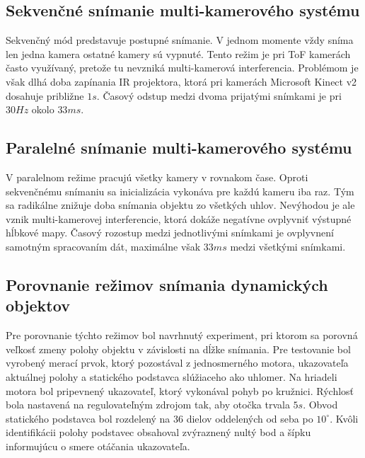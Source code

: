 \subsection{Sekvenčné snímanie multi-kamerového systému}

Sekvenčný mód predstavuje postupné snímanie. V jednom momente vždy sníma len jedna kamera ostatné kamery sú vypnuté. Tento režim je pri ToF kamerách často využívaný, pretože tu nevzniká multi-kamerová interferencia. Problémom je však dlhá doba zapínania IR projektora, ktorá pri kamerách Microsoft Kinect v2 dosahuje približne $1s$. Časový odstup medzi dvoma prijatými snímkami je pri $30Hz$ okolo $33ms$.

\subsection{Paralelné snímanie multi-kamerového systému}

V paralelnom režime pracujú všetky kamery v rovnakom čase. Oproti sekvenčnému snímaniu sa inicializácia vykonáva pre každú kameru iba raz. Tým sa radikálne znižuje doba snímania objektu zo všetkých uhlov. Nevýhodou je ale vznik multi-kamerovej interferencie, ktorá dokáže negatívne ovplyvniť výstupné hĺbkové mapy. Časový rozostup medzi jednotlivými snímkami je ovplyvnení samotným spracovaním dát, maximálne však $33ms$ medzi všetkými snímkami. 

\subsection{Porovnanie režimov snímania dynamických objektov}
\label{sec:serial_parallel}
Pre porovnanie týchto režimov bol navrhnutý experiment, pri ktorom sa porovná veľkosť zmeny polohy objektu v závislosti na dĺžke snímania. Pre testovanie bol vyrobený merací prvok, ktorý pozostával z jednosmerného motora, ukazovateľa aktuálnej polohy a statického podstavca slúžiaceho ako uhlomer. Na hriadeli motora bol pripevnený ukazovateľ, ktorý vykonával pohyb po kružnici. Rýchlosť bola nastavená na regulovateľným zdrojom tak, aby otočka trvala $5s$. Obvod statického podstavca bol rozdelený na 36 dielov oddelených od seba po $10^\circ$. Kvôli identifikácii polohy podstavec obsahoval zvýraznený nultý bod a šípku informujúcu o smere otáčania ukazovateľa.  

